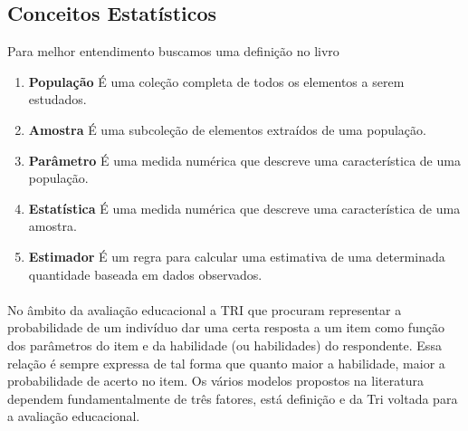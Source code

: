 	\subsection{Conceitos Estatísticos}
    	Para melhor entendimento buscamos uma definição no livro \cite{Sonia}
	 \begin{enumerate}
	 	\item[]  \textbf{População} É uma coleção completa de todos os elementos a serem estudados.
	 	\item[] \textbf{Amostra} É uma subcoleção de elementos extraídos de uma população.
	 	\item[] \textbf{Parâmetro} É uma medida numérica que descreve uma característica de uma população.
	 	 \item[] \textbf{Estatística} É uma medida numérica que descreve uma característica de uma amostra.
	 	 \item[] \textbf{Estimador} É um regra para calcular uma estimativa de uma determinada quantidade baseada em dados observados.
	\end{enumerate}
	\paragraph{}
	    No âmbito da avaliação educacional a TRI  que procuram representar a probabilidade de um indivíduo dar uma certa resposta a um item como função dos parâmetros do item e da habilidade (ou habilidades) do respondente. Essa relação é sempre expressa de tal forma que quanto maior a habilidade, maior a probabilidade de acerto no item. Os vários modelos propostos na literatura dependem fundamentalmente de três fatores, está definição e da Tri voltada para a avaliação educacional.

	\newpage